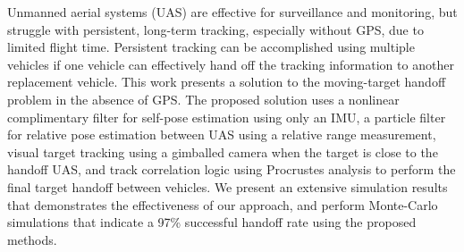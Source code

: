 \afterpage{\cleardoublepage}

Unmanned aerial systems (UAS) are effective for surveillance and monitoring, but struggle with persistent, long-term tracking, especially without GPS, due to limited flight time. Persistent tracking can be accomplished using multiple vehicles if one vehicle can effectively hand off the tracking information to another replacement vehicle. This work presents a solution to the moving-target handoff problem in the absence of GPS.  The proposed solution uses a nonlinear complimentary filter for self-pose estimation using only an IMU, a particle filter for relative pose estimation between UAS using a relative range measurement, visual target tracking using a gimballed camera when the target is close to the handoff UAS, and track correlation logic using Procrustes analysis to perform the final target handoff between vehicles.  We present an extensive simulation results that demonstrates the effectiveness of our approach, and perform Monte-Carlo simulations that indicate a 97\% successful handoff rate using the proposed methods.

